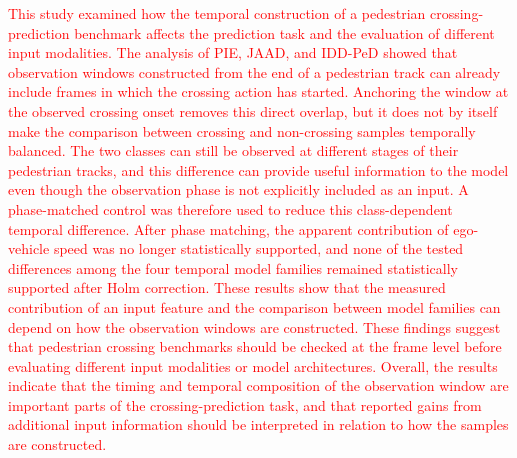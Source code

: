 \documentclass[mti,article,submit,moreauthors]{Definitions/mdpi}
\begin{document}
\textcolor{red}{This study examined how the temporal construction of a pedestrian crossing-prediction benchmark affects the prediction task and the evaluation of different input modalities. The analysis of PIE, JAAD, and IDD-PeD showed that observation windows constructed from the end of a pedestrian track can already include frames in which the crossing action has started. Anchoring the window at the observed crossing onset removes this direct overlap, but it does not by itself make the comparison between crossing and non-crossing samples temporally balanced. The two classes can still be observed at different stages of their pedestrian tracks, and this difference can provide useful information to the model even though the observation phase is not explicitly included as an input. A phase-matched control was therefore used to reduce this class-dependent temporal difference. After phase matching, the apparent contribution of ego-vehicle speed was no longer statistically supported, and none of the tested differences among the four temporal model families remained statistically supported after Holm correction. These results show that the measured contribution of an input feature and the comparison between model families can depend on how the observation windows are constructed. These findings suggest that pedestrian crossing benchmarks should be checked at the frame level before evaluating different input modalities or model architectures. Overall, the results indicate that the timing and temporal composition of the observation window are important parts of the crossing-prediction task, and that reported gains from additional input information should be interpreted in relation to how the samples are constructed.}


\vspace{6pt}




\end{document}
